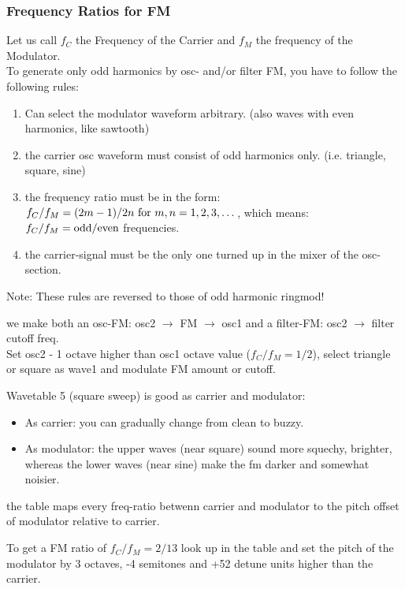 \subsubsection{Frequency Ratios for FM}
Let us call $f_C$ the Frequency of the Carrier and $f_M$ the frequency of the Modulator.\\
To generate only odd harmonics by osc- and/or filter FM, you have to follow the following rules:
\begin{enumerate}
	\item  Can select the modulator waveform arbitrary. (also waves with even harmonics, like sawtooth)
	\item the carrier osc waveform must consist of odd harmonics only. (i.e. triangle, square, sine)
	\item the frequency ratio must be in the form:
	$f_C / f_M = (2m-1) / 2n \text{ for } m,n = 1, 2, 3, \dots$, which	means: $f_C / f_M = \text{odd} / \text{even}$ frequencies.
	\item the carrier-signal must be the only one turned up in the mixer of the osc-section.
\end{enumerate}
Note: These rules are reversed to those of odd harmonic ringmod!
\begin{example}[Microwave 2/XT(k) or Q]
	we make both an osc-FM: osc2 $\to$ FM $\to$ osc1 and a filter-FM: osc2 $\to$ filter cutoff freq.\\
	Set osc2 - 1 octave higher than osc1 octave value ($f_C / f_M = 1 / 2$), select triangle or square as wave1 and modulate FM amount or cutoff.
\end{example}
\begin{example}[for XT]
	Wavetable 5 (square sweep) is good as carrier and modulator:
	\begin{itemize}
		\item As carrier: you can gradually change from clean to buzzy.
		\item As modulator: the upper waves (near square) sound more squechy, brighter, whereas the lower waves (near sine) make the fm darker and somewhat noisier.
	\end{itemize}
\end{example}
the table maps every freq-ratio betwenn carrier and modulator to the pitch offset of modulator relative to carrier.
\begin{example}
	To get a FM ratio of $f_C / f_M = 2 / 13$ look up in the table and set the pitch of the modulator by 3 octaves, -4 semitones and +52 detune units higher than the carrier.
\end{example}
